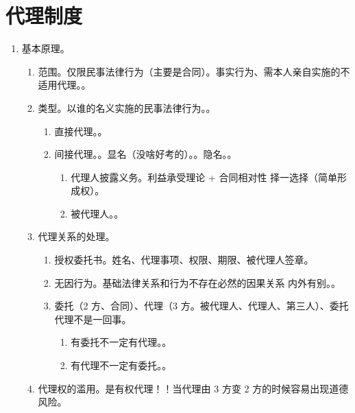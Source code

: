 \section{代理制度}
\begin{enumerate}
  \item 基本原理。
        \begin{enumerate}
          \item 范围。仅限民事法律行为（主要是合同）。事实行为、需本人亲自实施的不适用代理。。
          \item 类型。以谁的名义实施的民事法律行为。。
                \begin{enumerate}
                  \item 直接代理。。
                  \item 间接代理。。\yi 显名（没啥好考的）。。\er 隐名。。
                        \begin{enumerate}
                          \item 代理人披露义务。利益承受理论 + 合同相对性 \yjt {}择一选择（简单形成权）。
                          \item 被代理人。。
                        \end{enumerate}
                \end{enumerate}
          \item 代理关系的处理。
                \begin{enumerate}
                  \item 授权委托书。姓名、代理事项、权限、期限、被代理人签章。
                  \item 无因行为。基础法律关系和行为不存在必然的因果关系 \yjt 内外有别。。
                  \item 委托（2 方、合同）、代理（3 方。被代理人、代理人、第三人）、委托代理不是一回事。
                        \begin{enumerate}
                          \item 有委托不一定有代理。。
                          \item 有代理不一定有委托。。
                        \end{enumerate}
                \end{enumerate}
          \item 代理权的滥用。是有权代理！！当代理由 3 方变 2 方的时候容易出现道德风险。

\end{enumerate}
\end{enumerate}
